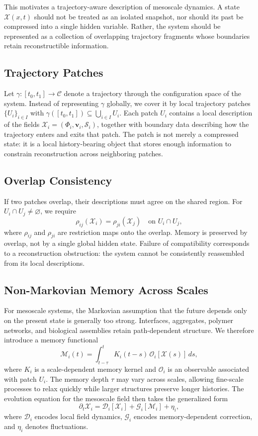 \documentclass[11pt, a4paper, twocolumn]{article}
\newcommand{\X}{\mathcal{X}}
\newcommand{\Sfield}{\mathcal{S}}
\begin{document}
This motivates a trajectory-aware description of mesoscale dynamics. A state
$\X(x,t)$ should not be treated as an isolated snapshot, nor should its past be
compressed into a single hidden variable. Rather, the system should be
represented as a collection of overlapping trajectory fragments whose boundaries
retain reconstructible information.

\subsection{Trajectory Patches}

Let $\gamma : [t_0,t_1] \to \mathcal{C}$ denote a trajectory through the
configuration space of the system. Instead of representing $\gamma$ globally,
we cover it by local trajectory patches $\{U_i\}_{i \in I}$ with
$\gamma([t_0,t_1]) \subseteq \bigcup_{i \in I} U_i$. Each patch $U_i$ contains
a local description of the fields $\X_i = (\Phi_i,\mathbf{v}_i,\Sfield_i)$,
together with boundary data describing how the trajectory enters and exits that
patch. The patch is not merely a compressed state: it is a local history-bearing
object that stores enough information to constrain reconstruction across
neighboring patches.

\subsection{Overlap Consistency}

If two patches overlap, their descriptions must agree on the shared region.
For $U_i \cap U_j \neq \varnothing$, we require
\[
    \rho_{ij}(\X_i) = \rho_{ji}(\X_j)
    \quad \text{on } U_i \cap U_j,
\]
where $\rho_{ij}$ and $\rho_{ji}$ are restriction maps onto the overlap.
Memory is preserved by overlap, not by a single global hidden state. Failure
of compatibility corresponds to a reconstruction obstruction: the system cannot
be consistently reassembled from its local descriptions.

\subsection{Non-Markovian Memory Across Scales}

For mesoscale systems, the Markovian assumption that the future depends only
on the present state is generally too strong. Interfaces, aggregates, polymer
networks, and biological assemblies retain path-dependent structure. We
therefore introduce a memory functional
\[
    \mathcal{M}_i(t)
    =
    \int_{t-\tau}^{t}
    K_i(t-s)\,\mathcal{O}_i[\X(s)]\,ds,
\]
where $K_i$ is a scale-dependent memory kernel and $\mathcal{O}_i$ is an
observable associated with patch $U_i$. The memory depth $\tau$ may vary
across scales, allowing fine-scale processes to relax quickly while larger
structures preserve longer histories. The evolution equation for the mesoscale
field then takes the generalized form
\[
    \partial_t \X_i
    =
    \mathcal{D}_i[\X_i]
    +
    \mathcal{G}_i[\mathcal{M}_i]
    +
    \eta_i,
\]
where $\mathcal{D}_i$ encodes local field dynamics, $\mathcal{G}_i$ encodes
memory-dependent correction, and $\eta_i$ denotes fluctuations.
\end{document}

